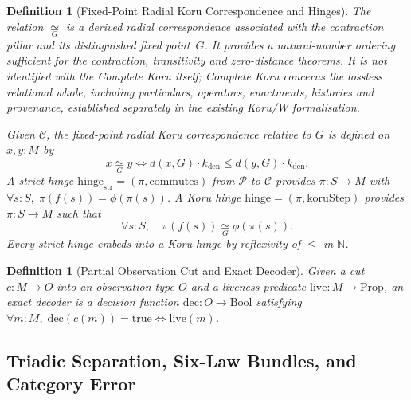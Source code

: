 \documentclass[12pt,a4paper]{article}
\newcommand{\koruG}{\mathrel{\underset{G}{\simeq}}}
\newtheorem{definition}[thm]{Definition}
\begin{document}
\begin{definition}[Fixed-Point Radial Koru Correspondence and Hinges]
The relation $\koruG$ is a derived radial correspondence associated with the contraction pillar and its distinguished fixed point~$G$. It provides a natural-number ordering sufficient for the contraction, transitivity and zero-distance theorems. It is not identified with the Complete Koru itself; Complete Koru concerns the lossless relational whole, including particulars, operators, enactments, histories and provenance, established separately in the existing Koru/W formalisation.

Given $\mathcal{C}$, the \emph{fixed-point radial Koru correspondence} relative to $G$ is defined on $x, y : M$ by
\[
x \mathrel{\koruG} y \iff d(x, G) \cdot k_{\mathrm{den}} \le d(y, G) \cdot k_{\mathrm{den}}.
\]
A \emph{strict hinge} $\mathrm{hinge}_{\mathrm{str}} = (\pi, \mathrm{commutes})$ from $\mathcal{P}$ to $\mathcal{C}$ provides $\pi : S \to M$ with $\forall s : S,\; \pi(f(s)) = \phi(\pi(s))$. A \emph{Koru hinge} $\mathrm{hinge} = (\pi, \mathrm{koruStep})$ provides $\pi : S \to M$ such that
\[
\forall s : S,\quad \pi(f(s)) \mathrel{\koruG} \phi(\pi(s)).
\]
Every strict hinge embeds into a Koru hinge by reflexivity of $\le$ in $\mathbb{N}$.
\end{definition}

\begin{definition}[Partial Observation Cut and Exact Decoder]
Given a cut $c : M \to O$ into an observation type $O$ and a liveness predicate $\mathrm{live} : M \to \mathrm{Prop}$, an \emph{exact decoder} is a decision function $\mathrm{dec} : O \to \mathrm{Bool}$ satisfying $\forall m : M,\; \mathrm{dec}(c(m)) = \mathrm{true} \iff \mathrm{live}(m)$.
\end{definition}

\subsection{Triadic Separation, Six-Law Bundles, and Category Error}
\end{document}
